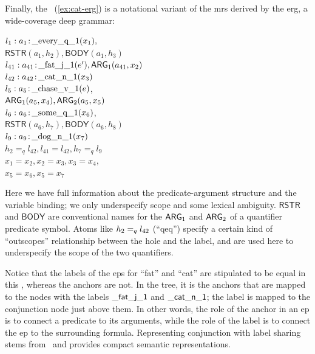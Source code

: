 Finally, the \rmrs\ (\ref{ex:cat-erg}) is a notational variant of the
{\sc mrs} derived by the {\sc erg}, a wide-coverage deep grammar:
\begin{examples}
\item $l_1:a_1\colon\!\mathrm{\_every\_q\_1}(x_1),$\\
\hspace*{0.1in}$\mathsf{RSTR}(a_1,h_2),
\mathsf{BODY}(a_1,h_3)$\\ 
$l_{41}:a_{41}\colon\!\mathrm{\_fat\_j\_1}(e'), \mathsf{ARG}_1(a_{41},x_2)$\\
$l_{42}:a_{42}\colon\!\mathrm{\_cat\_n\_1}(x_3)$\\
$l_5:a_5\colon\!\mathrm{\_chase\_v\_1}(e)$,\\
\hspace*{0.1in}$\mathsf{ARG}_1(a_5,x_4),
\mathsf{ARG}_2(a_5,x_5)$\\ 
$l_6:a_6\colon\!\mathrm{\_some\_q\_1}(x_6)$,\\
\hspace*{0.1in}$\mathsf{RSTR}(a_6,h_7),
\mathsf{BODY}(a_6,h_8)$\\ 
$l_9:a_9\colon\!\mathrm{\_dog\_n\_1}(x_7)$\\
$h_2=_q l_{42}, l_{41}=l_{42}, h_7 =_q l_9$\\
$x_1=x_2, x_2=x_3, x_3=x_4,$\\
$x_5=x_6, x_5=x_7$
\label{ex:cat-erg}
\end{examples}

Here we have full information about the predicate-argument structure
and the variable binding; we only underspecify scope and some lexical
ambiguity.  $\mathsf{RSTR}$ and $\mathsf{BODY}$ are conventional names
for the $\mathsf{ARG}_1$ and $\mathsf{ARG}_2$ of a quantifier predicate symbol.  Atoms
like $h_2 =_q l_{42}$ (``qeq'') specify a certain kind of
``outscopes'' relationship between the hole and the label, and are
used here to underspecify the scope of the two quantifiers.

Notice that the labels of the {\sc ep}s for ``fat'' and ``cat'' are
stipulated to be equal in this \rmrs, whereas the anchors are not.  In
the tree, it is the anchors that are mapped to the nodes with the
labels $\mathsf{\_fat\_j\_1}$ and $\mathsf{\_cat\_n\_1}$; the label is
mapped to the conjunction node just above them.  In other words, the
role of the anchor in an {\sc ep} is to connect a predicate to its
arguments, while the role of the label is to connect the {\sc ep} to
the surrounding formula.  Representing conjunction with label sharing
stems from \mrs\ and provides compact semantic representations.

